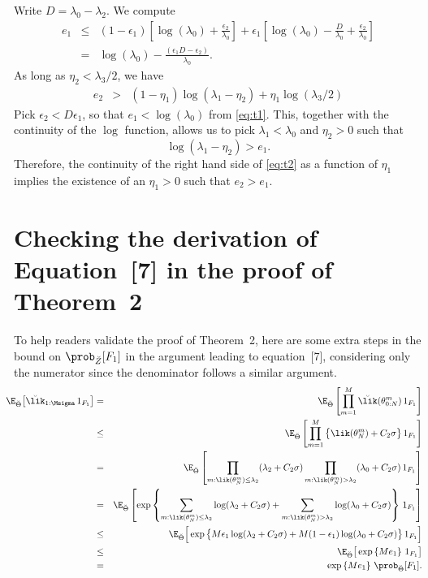 \documentclass[11pt]{article}
\begin{document}
Write $D=\lambda_0-\lambda_2$. We compute
\begin{eqnarray}\nonumber
e_1&\le& (1-\epsilon_1)\left[ \log(\lambda_0)+\frac{\epsilon_2}{\lambda_0}\right] + \epsilon_1\left[ \log(\lambda_0)-\frac{D}{\lambda_0} +\frac{\epsilon_2}{\lambda_0}\right]\\
\label{eq:t1}
&=& \log(\lambda_0)- \frac{(\epsilon_1D-\epsilon_2)}{\lambda_0}.
\end{eqnarray}
As long as $\eta_2<\lambda_3/2$, we have
\begin{eqnarray}\label{eq:t2}
e_2 &>& (1-\eta_1)\log(\lambda_1-\eta_2) +\eta_1\log(\lambda_3/2)
\end{eqnarray}
Pick $\epsilon_2<D\epsilon_1$, so that $e_1<\log(\lambda_0)$ from \eqref{eq:t1}. 
This, together with the continuity of the $\log$ function,  allows us to pick $\lambda_1<\lambda_0$  and $\eta_2>0$ such that 
\begin{equation}\label{eq:t3}
\log(\lambda_1-\eta_2)> e_1.
\end{equation}
Therefore, the continuity of the right hand side of \eqref{eq:t2} as a function of $\eta_1$ implies the existence of an $\eta_1>0$ such that $e_2>e_1$.

\section{Checking the derivation of Equation~[7] in the proof of Theorem~2}

To help readers validate the proof of Theorem~2, here are some extra steps in the bound on $\prob_{\breve Z}[F_1]$ in the argument leading to equation~[7], considering only the numerator since the denominator follows a similar argument.
\begin{eqnarray*}
\label{eq:like5}
\hspace{-3mm} 
\E_{\breve \Theta}\big[\breve\lik_{1:\Msigma}\, 1_{F_1}\big] &=&
\E_{\breve \Theta}\left[  \prod_{m=1}^M \breve\lik(\theta^m_{0:N})\, 1_{F_1}\right] \\
\label{eq:like6}
&\le& 
\E_{\breve \Theta}\left[\prod_{m=1}^M \big\{ \lik(\theta^m_N)+C_2\sigma \big\} \, 1_{F_1}\right]
\\
\nonumber
&=&
\E_{\breve \Theta}\left[\prod_{m:\lik(\theta^m_N)\le\lambda_2}(\lambda_2+C_2\sigma) \prod_{m:\lik(\theta^m_N)>\lambda_2}(\lambda_0+C_2\sigma)\, 1_{F_1}\right] \\
\nonumber
&=& \E_{\breve \Theta}\left[\exp\left\{ \sum_{m:\lik(\theta^m_N)\le\lambda_2}\log(\lambda_2+C_2\sigma) +\sum_{m:\lik(\theta^m_N)>\lambda_2}\log(\lambda_0+C_2\sigma)\right\}\, 1_{F_1} \right]\\
\nonumber
&\le& 
\E_{\breve \Theta}\Big[\exp\big\{ M\epsilon_1\log(\lambda_2+C_2\sigma) + M(1-\epsilon_1)\log(\lambda_0+C_2\sigma)\big\}\, 1_{F_1}\Big] \\
&\le& 
\label{eq:like6b}
\E_{\breve \Theta}\big[\exp\left\{ Me_1\right\} \, 1_{F_1}\big] \\
\label{eq:like7}
&=& \exp\left\{Me_1\right\}\, \prob_{\breve \Theta}[F_1].
\end{eqnarray*} 


\end{document}

